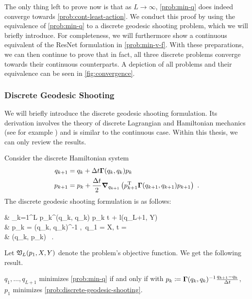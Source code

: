 
The only thing left to prove now is that as $L \rightarrow \infty$, \cref{prob:min-q} does indeed converge towards \cref{prob:cont-least-action}.
We conduct this proof by using the equivalence of \cref{prob:min-q} to a discrete geodesic shooting problem, which we will briefly introduce.
For completeness, we will furthermore show a continuous equivalent of the ResNet formulation in \cref{prob:min-v-f}.
With these preparations, we can then continue to prove that in fact, all three discrete problems converge towards their continuous counterparts.
A depiction of all problems and their equivalence can be seen in \cref{fig:convergence}.



\subsubsection{Discrete Geodesic Shooting}

We will briefly introduce the discrete geodesic shooting formulation.
Its derivation involves the theory of discrete Lagrangian and Hamiltonian mechanics (see for example \cite{west04}) and is similar to the continuous case.
Within this thesis, we can only review the results.

Consider the discrete Hamiltonian system
\begin{equation}
	\label{eq:discrete-hamiltonian-system}
	\begin{split}
		q_{k+1} &= q_k + \Delta t \mathbf{\Gamma}(q_k, q_k) p_k\\
		p_{k+1} &= p_k + \frac{\Delta t}{2} \grad_{q_{k+1}} \left(p_{k+1}^{\mathrm{T}} \mathbf{\Gamma}(q_{k+1}, q_{k+1}) p_{k+1}\right)\ .
	\end{split}
\end{equation}
The discrete geodesic shooting formulation is as follows:
\begin{problem}
	\label{prob:discrete-geodesic-shooting}
	\begin{cases}
		 &  \sum_{k=1}^L p_k^\T \bGamma(q_k, q_k) p_k \Delta t + l(q_{L+1}, Y)\\
		 & p_k = \bGamma(q_k, q_k)^{-1} ,\ q_1 = X, \Delta t =  \\
		& (q_k, p_k) \ .
	\end{cases}
\end{problem}
Let $\mathfrak{V}_L(p_1, X, Y)$ denote the problem's objective function.
We get the following result.
\begin{theorem}
	\label{theo:discrete-shooting-min-q-equivalence}
	$q_1, \dots, q_{L+1}$ minimizes \cref{prob:min-q} if and only if with $p_k \coloneqq \mathbf{\Gamma}(q_k, q_k)^{-1} \frac{q_{k+1} - q_k}{\Delta t}$, $p_1$ minimizes \cref{prob:discrete-geodesic-shooting}.
\end{theorem}

